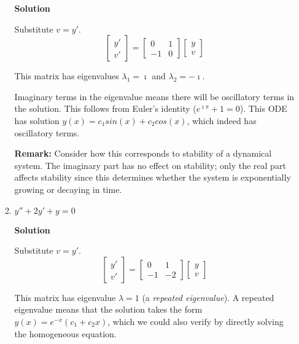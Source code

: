 \documentclass[letterpaper, fontsize=11pt]{scrartcl} %
\numberwithin{equation}{section} %
\numberwithin{figure}{section} %
\numberwithin{table}{section} %
\begin{document}
\begin{enumerate}
\begin{enumerate}
\textbf{Solution} \newline
\par Substitute $v = y'$. 
$$\left[ \begin{array}{c}
y' \\
v' \end{array} \right] = 
\left[
\begin{array}{cc} 0 & 1 \\ -1 & 0 \end{array} \right]
\left[ \begin{array}{c}
y \\
v \end{array} \right]$$
\par This matrix has eigenvalues $\lambda_1 = \imath$ and $\lambda_2 = -\imath$. \par Imaginary terms in the eigenvalue means there will be oscillatory terms in the solution. This follows from Euler's identity ($e^{\imath \pi} + 1 = 0$). This ODE has solution $y(x) = c_1 sin(x) + c_2 cos(x)$, which indeed has oscillatory terms. \par \textbf{Remark:} Consider how this corresponds to stability of a dynamical system. The imaginary part has no effect on stability; only the real part affects stability since this determines whether the system is exponentially growing or decaying in time.


\item $y'' + 2y' + y = 0$\par

\textbf{Solution} \newline
\par Substitute $v = y'$. 
$$\left[ \begin{array}{c}
y' \\
v' \end{array} \right] = 
\left[
\begin{array}{cc} 0 & 1 \\ -1 & -2 \end{array} \right]
\left[ \begin{array}{c}
y \\
v \end{array} \right]$$
\par This matrix has eigenvalue $\lambda = 1$ (a \textit{repeated eigenvalue}). A repeated eigenvalue means that the solution takes the form $y(x) = e^{-x}(c_1 + c_2x)$, which we could also verify by directly solving the homogeneous equation. 

\end{enumerate}

\end{enumerate}

\end{document}
